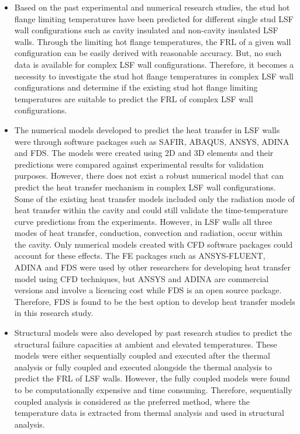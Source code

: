 \begin{itemize}
	\item Based on the past experimental and numerical research studies, the stud hot flange limiting temperatures have been predicted for different single stud LSF wall configurations such as cavity insulated and non-cavity insulated LSF walls. Through the limiting hot flange temperatures, the FRL of a given wall configuration can be easily derived with reasonable accuracy. But, no such data is available for complex LSF wall configurations. Therefore, it becomes a necessity to investigate the stud hot flange temperatures in complex LSF wall configurations and determine if the existing stud hot flange limiting temperatures are suitable to predict the FRL of complex LSF wall configurations. 
	\item The numerical models developed to predict the heat transfer in LSF walls were through software packages such as SAFIR, ABAQUS, ANSYS, ADINA and FDS. The models were created using 2D and 3D elements and their predictions were compared against experimental results for validation purposes. However, there does not exist a robust numerical model that can predict the heat transfer mechanism in complex LSF wall configurations. Some of the existing heat transfer models included only the radiation mode of heat transfer within the cavity and could still validate the time-temperature curve predictions from the experiments. However, in LSF walls all three modes of heat transfer, conduction, convection and radiation, occur within the cavity. Only numerical models created with CFD software packages could account for these effects. The FE packages such as ANSYS-FLUENT, ADINA and FDS were used by other researchers for developing heat transfer model using CFD techniques, but ANSYS and ADINA are commercial versions and involve a licencing cost while FDS is an open source package. Therefore, FDS is found to be the best option to develop heat transfer models in this research study.
	\item Structural models were also developed by past research studies to predict the structural failure capacities at ambient and elevated temperatures. These models were either sequentially coupled and executed after the thermal analysis or fully coupled and executed alongside the thermal analysis to predict the FRL of LSF walls. However, the fully coupled models were found to be computationally expensive and time consuming. Therefore, sequentially coupled analysis is considered as the preferred method, where the temperature data is extracted from thermal analysis and used in structural analysis.

\end{itemize}
